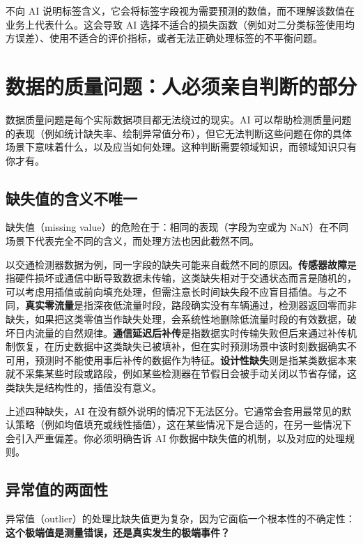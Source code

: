 不向 AI 说明标签含义，它会将标签字段视为需要预测的数值，而不理解该数值在业务上代表什么。这会导致 AI 选择不适合的损失函数（例如对二分类标签使用均方误差）、使用不适合的评价指标，或者无法正确处理标签的不平衡问题。

\section{数据的质量问题：人必须亲自判断的部分}

数据质量问题是每个实际数据项目都无法绕过的现实。AI 可以帮助检测质量问题的表现（例如统计缺失率、绘制异常值分布），但它无法判断这些问题在你的具体场景下意味着什么，以及应当如何处理。这种判断需要领域知识，而领域知识只有你才有。

\subsection{缺失值的含义不唯一}

缺失值（missing value）的危险在于：相同的表现（字段为空或为 NaN）在不同场景下代表完全不同的含义，而处理方法也因此截然不同。

以交通检测器数据为例，同一字段的缺失可能来自截然不同的原因。\textbf{传感器故障}是指硬件损坏或通信中断导致数据未传输，这类缺失相对于交通状态而言是随机的，可以考虑用插值或前向填充处理，但需注意长时间缺失段不应盲目插值。与之不同，\textbf{真实零流量}是指深夜低流量时段，路段确实没有车辆通过，检测器返回零而非缺失，如果把这类零值当作缺失处理，会系统性地删除低流量时段的有效数据，破坏日内流量的自然规律。\textbf{通信延迟后补传}是指数据实时传输失败但后来通过补传机制恢复，在历史数据中这类缺失已被填补，但在实时预测场景中该时刻数据确实不可用，预测时不能使用事后补传的数据作为特征。\textbf{设计性缺失}则是指某类数据本来就不采集某些时段或路段，例如某些检测器在节假日会被手动关闭以节省存储，这类缺失是结构性的，插值没有意义。

上述四种缺失，AI 在没有额外说明的情况下无法区分。它通常会套用最常见的默认策略（例如均值填充或线性插值），这在某些情况下是合适的，在另一些情况下会引入严重偏差。你必须明确告诉 AI 你数据中缺失值的机制，以及对应的处理规则。

\subsection{异常值的两面性}

异常值（outlier）的处理比缺失值更为复杂，因为它面临一个根本性的不确定性：\textbf{这个极端值是测量错误，还是真实发生的极端事件？}

